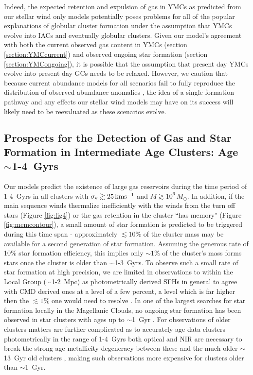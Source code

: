 \documentclass[fleqn,usenatbib]{mnras}
\begin{document}
 Indeed, the expected retention and expulsion of gas in YMCs as predicted from our stellar wind only models potentially poses problems for all of the popular explanations of globular cluster formation under the assumption that YMCs evolve into IACs and eventually globular clusters.
 Given our model's agreement with both the current observed gas content in YMCs (section \ref{section:YMCcurrent}) and observed ongoing star formation (section \ref{section:YMCongoing}), it is possible that the assumption that present day YMCs evolve into present day GCs needs to be relaxed.
 However, we caution that because current abundance models for all scenarios fail to fully reproduce the distribution of observed abundance anomalies \citep{bastian2015a}, the idea of a single formation pathway and any effects our stellar wind models may have on its success will likely need to be reevaluated as these scenarios evolve.


\subsection{Prospects for the Detection of Gas and Star Formation in Intermediate Age Clusters: Age $\sim$1-4~Gyrs} \label{section:IACs}

 Our models predict the existence of large gas reservoirs during the time period of 1-4~Gyrs in all clusters with $\sigma_{\rm v} \gtrsim 25 \, {\rm km s^{-1}}$ and $M \gtrsim 10^6 \, M_\odot$.
 In addition, if the main sequence winds thermalize inefficiently with the winds from the turn off stars (Figure \ref{fig:fig4}) or the gas retention in the cluster ``has memory" (Figure \ref{fig:memcontour}), a small amount of star formation is predicted to be triggered during this time span - approximately $\lesssim 10$\% of the cluster mass may be available for a second generation of star formation.  
 Assuming the generous rate of 10\% star formation efficiency, this implies only $\sim 1$\% of the cluster's mass forms stars once the cluster is older than $\sim$1-3~Gyrs.
 To observe such a small rate of star formation at high precision, we are limited in observations to within the Local Group ($\sim$1-2~Mpc) as photometrically derived SFHs in general to agree with CMD derived ones at a level of a few percent, a level which is far higher then the $\lesssim 1$\% one would need to resolve \citep{ruiz2015}.
 In one of the largest searches for star formation locally in the Magellanic Clouds, no ongoing star formation has been observed in star clusters with ages up to $\sim$1~Gyr \citep{bastian2013a}.
 For observations of older clusters matters are further complicated as to accurately age data clusters photometrically in the range of 1-4~Gyrs both optical and NIR are necessary to break the strong age-metallicity degeneracy between these and the much older $\sim$13~Gyr old clusters \citep{trancho2014}, making such observations more expensive for clusters older than $\sim$1~Gyr.
\end{document}
